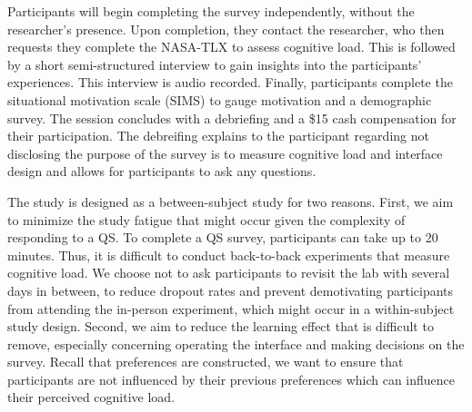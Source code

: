 Participants will begin completing the survey independently, without the researcher's presence. Upon completion, they contact the researcher, who then requests they complete the NASA-TLX to assess cognitive load. This is followed by a short semi-structured interview to gain insights into the participants' experiences. This interview is audio recorded. Finally, participants complete the situational motivation scale (SIMS) to gauge motivation and a demographic survey. The session concludes with a debriefing and a \$15 cash compensation for their participation. The debreifing explains to the participant regarding not disclosing the purpose of the survey is to measure cognitive load and interface design and allows for participants to ask any questions.

The study is designed as a between-subject study for two reasons. First, we aim to minimize the study fatigue that might occur given the complexity of responding to a QS. To complete a QS survey, participants can take up to 20 minutes. Thus, it is difficult to conduct back-to-back experiments that measure cognitive load. We choose not to ask participants to revisit the lab with several days in between, to reduce dropout rates and prevent demotivating participants from attending the in-person experiment, which might occur in a within-subject study design. Second, we aim to reduce the learning effect that is difficult to remove, especially concerning operating the interface and making decisions on the survey. Recall that preferences are constructed, we want to ensure that participants are not influenced by their previous preferences which can influence their perceived cognitive load.

